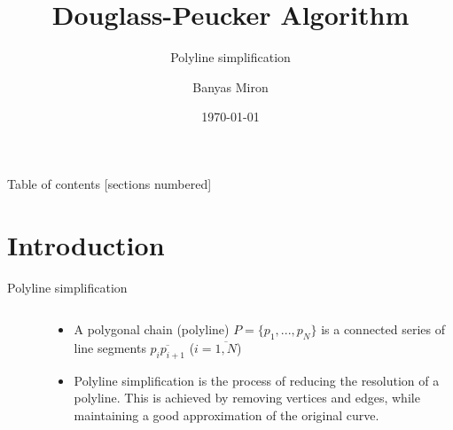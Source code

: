 \documentclass[10pt]{beamer}
\title{Douglass-Peucker Algorithm}
\subtitle{Polyline simplification}
\date{\today}
\author{Banyas Miron}
\institute{Kyiv Algorithms Club}
\begin{document}
\maketitle

\begin{frame}{Table of contents}
  [sections numbered]
  \tableofcontents[hideallsubsections]
\end{frame}

\section{Introduction}

\begin{frame}{Polyline simplification}
	\begin{columns}
		\begin{column}{0.5\textwidth} 
			\begin{figure}[h]
			\end{figure}
		\end{column}
		\begin{column}{0.5\textwidth}
			\begin{itemize}
				\item \alert{A polygonal chain (polyline)} $P=\{p_1, ... ,p_N\} $  is a 
				 	  connected series of line segments $\overline{p_ip_{i+1}}$ ($ i = \overline{1,N} $)
				\item \alert{Polyline simplification} is the process of reducing the resolution of a polyline. 
				      This is achieved by removing vertices and edges, while maintaining a good approximation of the original curve. 		
			\end{itemize}
		\end{column}
	\end{columns}
\end{frame}
\end{document}
